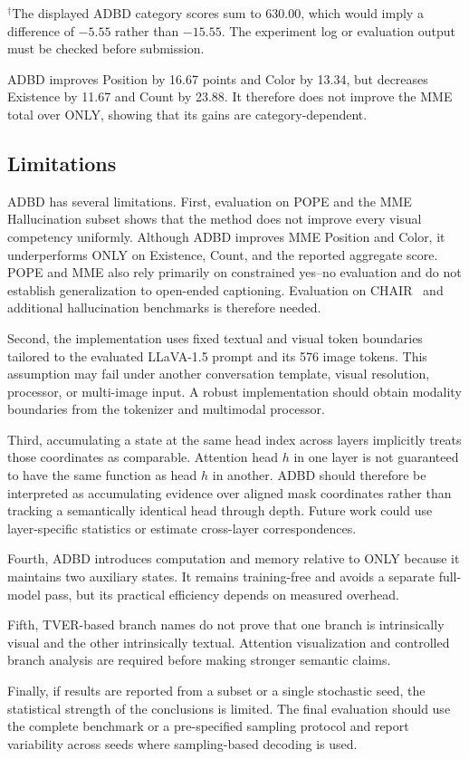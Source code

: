 \noindent$^{\dagger}$The displayed ADBD category scores sum to 630.00, which would imply a difference of $-5.55$ rather than $-15.55$. The experiment log or evaluation output must be checked before submission.

ADBD improves Position by 16.67 points and Color by 13.34, but decreases Existence by 11.67 and Count by 23.88. It therefore does not improve the MME total over ONLY, showing that its gains are category-dependent.

\subsection{Limitations}
\label{sec:limitations}

ADBD has several limitations. First, evaluation on POPE and the MME Hallucination subset shows that the method does not improve every visual competency uniformly. Although ADBD improves MME Position and Color, it underperforms ONLY on Existence, Count, and the reported aggregate score. POPE and MME also rely primarily on constrained yes--no evaluation and do not establish generalization to open-ended captioning. Evaluation on CHAIR~\cite{rohrbach2018object} and additional hallucination benchmarks is therefore needed.

Second, the implementation uses fixed textual and visual token boundaries tailored to the evaluated LLaVA-1.5 prompt and its 576 image tokens. This assumption may fail under another conversation template, visual resolution, processor, or multi-image input. A robust implementation should obtain modality boundaries from the tokenizer and multimodal processor.

Third, accumulating a state at the same head index across layers implicitly treats those coordinates as comparable. Attention head $h$ in one layer is not guaranteed to have the same function as head $h$ in another. ADBD should therefore be interpreted as accumulating evidence over aligned mask coordinates rather than tracking a semantically identical head through depth. Future work could use layer-specific statistics or estimate cross-layer correspondences.

Fourth, ADBD introduces computation and memory relative to ONLY because it maintains two auxiliary states. It remains training-free and avoids a separate full-model pass, but its practical efficiency depends on measured overhead.

Fifth, TVER-based branch names do not prove that one branch is intrinsically visual and the other intrinsically textual. Attention visualization and controlled branch analysis are required before making stronger semantic claims.

Finally, if results are reported from a subset or a single stochastic seed, the statistical strength of the conclusions is limited. The final evaluation should use the complete benchmark or a pre-specified sampling protocol and report variability across seeds where sampling-based decoding is used.
